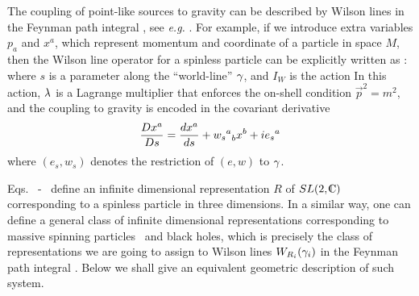 The coupling of point-like sources to gravity can be
described by Wilson lines in the Feynman path integral \zwpathint,
see {\it e.g.} .
For example, if we introduce extra variables $p_a$ and $x^a$,
which represent momentum and coordinate of a particle in space $M$,
then the Wilson line operator for a spinless particle can be
explicitly written as \Wittenamp:
%
\eqn{}
%
where $s$ is a parameter along the ``world-line'' $\gamma$,
and $I_W$ is the action
%
\eqn{}
%
In this action, $\lambda$ is a Lagrange multiplier that enforces
the on-shell condition $\vec p^2 = m^2$, and the coupling
to gravity is encoded in the covariant derivative
$$
{D x^a \over Ds} = {dx^a \over ds} + {{w_s}^a}_b x^b + i {e_s}^a
$$
where $(e_s, w_s)$ denotes the restriction of $(e,w)$ to $\gamma$.

Eqs. \wsource\ - \iwline\ define
an infinite dimensional representation $R$ of $SL(2,\IC)$
corresponding to a spinless particle in three dimensions.
In a similar way, one can define a general class of infinite
dimensional representations corresponding to massive spinning
particles \Gerbert\ and black holes,
which is precisely the class of representations we are going to
assign to Wilson lines $W_{R_i} (\gamma_i)$
in the Feynman path integral \zwpathint.
Below we shall give an equivalent geometric
description of such system.



